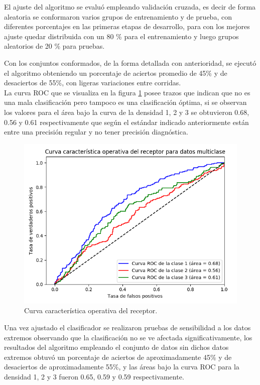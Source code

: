 El ajuste del algoritmo se evaluó empleando validación cruzada, es decir de forma aleatoria se conformaron varios grupos de entrenamiento y de prueba, con diferentes porcentajes en las primeras etapas de desarrollo, para con los mejores ajuste quedar distribuida con un 80 \% para el entrenamiento y luego grupos aleatorios de 20 \% para pruebas.

Con los conjuntos conformados, de la forma detallada con anterioridad, se ejecutó el algoritmo obteniendo  un porcentaje de aciertos promedio de  45\% y de desaciertos de 55\%, con ligeras variaciones entre corridas.\\

La curva ROC que se visualiza en la figura \ref{fig:roc} posee trazos que indican que no es una mala clasificación pero tampoco es una clasificación óptima, si se observan los valores para el área bajo la curva de la densidad 1, 2 y 3
se obtuvieron 0.68, 0.56 y 0.61 respectivamente que según el estándar indicado anteriormente
están entre una precisión regular y no tener precisión diagnóstica.\\

\begin{figure}[h!]
	\centering
	\includegraphics[scale=0.6]{roc.png}
	\caption{Curva característica operativa del receptor.}
	\label{fig:roc}
\end{figure}

Una vez ajustado el clasificador se realizaron pruebas de sensibilidad a los datos extremos observando que la clasificación no se ve afectada significativamente, los resultados del algoritmo empleando el conjunto de datos sin dichos datos extremos obtuvó un porcentaje de aciertos de aproximadamente 45\% y de desaciertos de aproximadamente 55\%, y las áreas bajo la curva ROC para la densidad 1, 2 y 3 fueron 0.65, 0.59 y 0.59 respectivamente.\\

